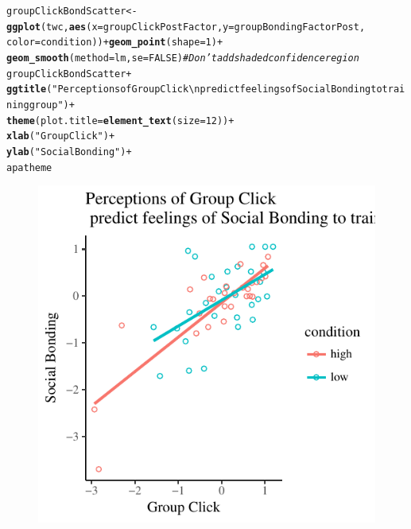 \documentclass[english]{article}\usepackage[]{graphicx}\usepackage[]{color}
\makeatletter
\def\maxwidth{ %
  \ifdim\Gin@nat@width>\linewidth
    \linewidth
  \else
    \Gin@nat@width
  \fi
}
\newcommand{\hlnum}[1]{\textcolor[rgb]{0.686,0.059,0.569}{#1}}%
\newcommand{\hlstr}[1]{\textcolor[rgb]{0.192,0.494,0.8}{#1}}%
\newcommand{\hlcom}[1]{\textcolor[rgb]{0.678,0.584,0.686}{\textit{#1}}}%
\newcommand{\hlopt}[1]{\textcolor[rgb]{0,0,0}{#1}}%
\newcommand{\hlstd}[1]{\textcolor[rgb]{0.345,0.345,0.345}{#1}}%
\newcommand{\hlkwb}[1]{\textcolor[rgb]{0.69,0.353,0.396}{#1}}%
\newcommand{\hlkwc}[1]{\textcolor[rgb]{0.333,0.667,0.333}{#1}}%
\newcommand{\hlkwd}[1]{\textcolor[rgb]{0.737,0.353,0.396}{\textbf{#1}}}%
\newenvironment{kframe}{%
 \def\at@end@of@kframe{}%
 \ifinner\ifhmode%
  \def\at@end@of@kframe{\end{minipage}}%
  \begin{minipage}{\columnwidth}%
 \fi\fi%
 \def\FrameCommand##1{\hskip\@totalleftmargin \hskip-\fboxsep
 \colorbox{shadecolor}{##1}\hskip-\fboxsep
     \hskip-\linewidth \hskip-\@totalleftmargin \hskip\columnwidth}%
 \MakeFramed {\advance\hsize-\width
   \@totalleftmargin\z@ \linewidth\hsize
   \@setminipage}}%
 {\par\unskip\endMakeFramed%
 \at@end@of@kframe}
\newenvironment{knitrout}{}{} %
\makeatother
\begin{document}
\begin{knitrout}
\color{fgcolor}\begin{kframe}
\begin{alltt}
\hlstd{groupClickBondScatter} \hlkwb{<-} \hlkwd{ggplot}\hlstd{(twc,} \hlkwd{aes}\hlstd{(}\hlkwc{x}\hlstd{=groupClickPostFactor,} \hlkwc{y}\hlstd{=groupBondingFactorPost,}
                            \hlkwc{color}\hlstd{=condition))} \hlopt{+} \hlkwd{geom_point}\hlstd{(}\hlkwc{shape} \hlstd{=} \hlnum{1}\hlstd{)} \hlopt{+}
                            \hlkwd{geom_smooth}\hlstd{(}\hlkwc{method}\hlstd{=lm,} \hlkwc{se}\hlstd{=}\hlnum{FALSE}\hlstd{)}   \hlcom{# Don't add shaded confidence region}
\hlstd{groupClickBondScatter} \hlopt{+}
            \hlkwd{ggtitle}\hlstd{(}\hlstr{"Perceptions of Group Click \textbackslash{}n predict feelings of Social Bonding to training group"}\hlstd{)} \hlopt{+}
            \hlkwd{theme}\hlstd{(}\hlkwc{plot.title} \hlstd{=} \hlkwd{element_text}\hlstd{(}\hlkwc{size}\hlstd{=}\hlnum{12}\hlstd{))} \hlopt{+}
            \hlkwd{xlab}\hlstd{(}\hlstr{"Group Click"}\hlstd{)} \hlopt{+}
            \hlkwd{ylab}\hlstd{(}\hlstr{"Social Bonding"}\hlstd{)} \hlopt{+}
            \hlstd{apatheme}
\end{alltt}


{\ttfamily\noindent\color{warningcolor}{\#\# Warning: Removed 1 rows containing non-finite values (stat\_smooth).}}

{\ttfamily\noindent\color{warningcolor}{\#\# Warning: Removed 1 rows containing missing values (geom\_point).}}\end{kframe}\begin{figure}

{\centering \includegraphics[width=\maxwidth]{figure/groupClickBondScatter-1} 

}

\end{figure}


\end{knitrout}
\end{document}
